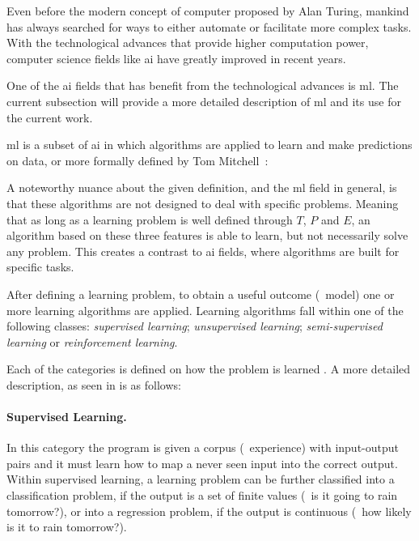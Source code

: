 Even before the modern concept of computer proposed by Alan Turing, mankind has always searched for ways to either automate or facilitate more complex tasks.
With the technological advances that provide higher computation power, computer science fields like \gls{ai} have greatly improved in recent years.

One of the \gls{ai} fields that has benefit from the technological advances is \gls{ml}.
The current subsection will provide a more detailed description of \gls{ml} and its use for the current work.

\gls{ml} is a subset of \gls{ai} in which algorithms are applied to learn and make predictions on data, or more formally defined by Tom Mitchell~\cite{mitchell:ml}:
\begin{center}
\end{center}

A noteworthy nuance about the given definition, and the \gls{ml} field in general, is that these algorithms are not designed to deal with specific problems.
Meaning that as long as a learning problem is well defined through $T$, $P$ and $E$, an algorithm based on these three features is able to learn, but not necessarily solve any problem.
This creates a contrast to \gls{ai} fields, where algorithms are built for specific tasks.

After defining a learning problem, to obtain a useful outcome (\ie\ model) one or more learning algorithms are applied.
Learning algorithms fall within one of the following classes: \textit{supervised learning}; \textit{unsupervised learning}; \textit{semi-supervised learning} or \textit{reinforcement learning}.

Each of the categories is defined on how the problem is learned . A more detailed description, as seen in \cite{norvig:ai} is as follows:

\paragraph{Supervised Learning.} In this category the program is given a corpus (\ie\ experience) with input-output pairs and it must learn how to map a never seen input into the correct output.
Within supervised learning, a learning problem can be further classified into a classification problem, if the output is a set of finite values (\eg\ is it going to rain tomorrow?), or into a regression problem, if the output is continuous (\eg\ how likely is it to rain tomorrow?).

